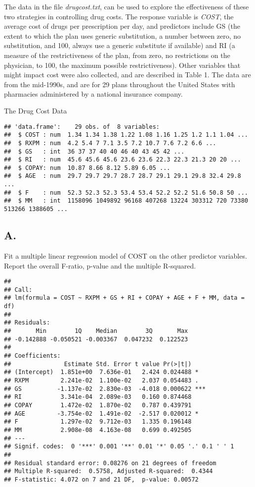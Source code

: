 \documentclass[]{article}
\begin{document}
The data in the file \emph{drugcost.txt}, can be used to explore the
effectiveness of these two strategies in controlling drug costs. The
response variable is \emph{COST}, the average cost of drugs per
prescription per day, and predictors include GS (the extent to which the
plan uses generic substitution, a number between zero, no substitution,
and 100, always use a generic substitute if available) and RI (a measure
of the restrictiveness of the plan, from zero, no restrictions on the
physician, to 100, the maximum possible restrictiveness). Other
variables that might impact cost were also collected, and are described
in Table 1. The data are from the mid-1990s, and are for 29 plans
throughout the United States with pharmacies administered by a national
insurance company.

The Drug Cost Data

\begin{verbatim}
## 'data.frame':    29 obs. of  8 variables:
##  $ COST : num  1.34 1.34 1.38 1.22 1.08 1.16 1.25 1.2 1.1 1.04 ...
##  $ RXPM : num  4.2 5.4 7 7.1 3.5 7.2 10.7 7.6 7.2 6.6 ...
##  $ GS   : int  36 37 37 40 40 46 40 43 45 42 ...
##  $ RI   : num  45.6 45.6 45.6 23.6 23.6 22.3 22.3 21.3 20 20 ...
##  $ COPAY: num  10.87 8.66 8.12 5.89 6.05 ...
##  $ AGE  : num  29.7 29.7 29.7 28.7 28.7 29.1 29.1 29.8 32.4 29.8 ...
##  $ F    : num  52.3 52.3 52.3 53.4 53.4 52.2 52.2 51.6 50.8 50 ...
##  $ MM   : int  1158096 1049892 96168 407268 13224 303312 720 73380 513266 1388605 ...
\end{verbatim}

\subsection{A.}\label{a.}

Fit a multiple linear regression model of COST on the other predictor
variables. Report the overall F-ratio, p-value and the multiple
R-squared.

\begin{verbatim}
## 
## Call:
## lm(formula = COST ~ RXPM + GS + RI + COPAY + AGE + F + MM, data = df)
## 
## Residuals:
##       Min        1Q    Median        3Q       Max 
## -0.142888 -0.050521 -0.003367  0.047232  0.122523 
## 
## Coefficients:
##               Estimate Std. Error t value Pr(>|t|)    
## (Intercept)  1.851e+00  7.636e-01   2.424 0.024488 *  
## RXPM         2.241e-02  1.100e-02   2.037 0.054483 .  
## GS          -1.137e-02  2.830e-03  -4.018 0.000622 ***
## RI           3.341e-04  2.089e-03   0.160 0.874468    
## COPAY        1.472e-02  1.870e-02   0.787 0.439791    
## AGE         -3.754e-02  1.491e-02  -2.517 0.020012 *  
## F            1.297e-02  9.712e-03   1.335 0.196148    
## MM           2.908e-08  4.163e-08   0.699 0.492505    
## ---
## Signif. codes:  0 '***' 0.001 '**' 0.01 '*' 0.05 '.' 0.1 ' ' 1
## 
## Residual standard error: 0.08276 on 21 degrees of freedom
## Multiple R-squared:  0.5758, Adjusted R-squared:  0.4344 
## F-statistic: 4.072 on 7 and 21 DF,  p-value: 0.00572
\end{verbatim}
\end{document}
